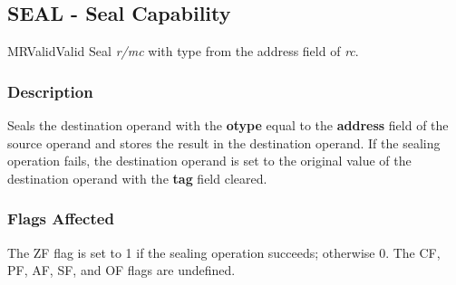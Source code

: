 \clearpage
{}
{}
\subsection*{SEAL - Seal Capability}

\begin{x86opcodetable}
  {MR}{Valid}{Valid}
  {Seal \emph{r/mc} with type from the address field of \emph{rc}.}
\end{x86opcodetable}

\begin{x86opentable}
\end{x86opentable}

\subsubsection*{Description}

Seals the destination operand with the \textbf{otype} equal to the
\textbf{address} field of the source operand and stores the result in
the destination operand.  If the sealing operation fails, the
destination operand is set to the original value of the destination
operand with the \textbf{tag} field cleared.

\subsubsection*{Flags Affected}

The ZF flag is set to 1 if the sealing operation succeeds; otherwise
0.  The CF, PF, AF, SF, and OF flags are undefined.
